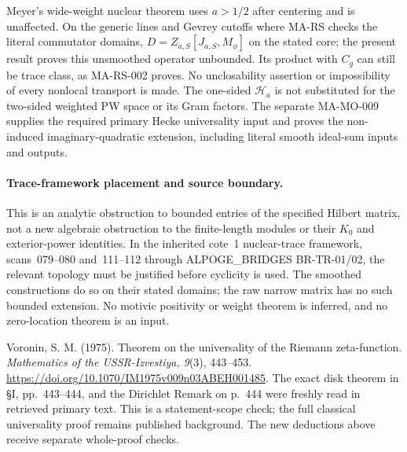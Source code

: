 Meyer's wide-weight nuclear theorem uses \(a>1/2\)
after centering and is unaffected.
On the generic lines and Gevrey cutoffs where MA-RS
checks the literal commutator domains,
\(D=Z_{a,S}[J_{a,S},M_\phi]\) on the stated core;
the present result proves this unsmoothed operator
unbounded. Its product with \(C_g\) can still be
trace class, as MA-RS-002 proves.
No unclosability assertion or impossibility of
every nonlocal transport is made.
The one-sided \(\mathcal H_a\) is not substituted
for the two-sided weighted PW space or its Gram factors.
The separate MA-MO-009 supplies the required primary
Hecke universality input and proves the non-induced
imaginary-quadratic extension, including literal
smooth ideal-sum inputs and outputs.

\paragraph{Trace-framework placement and source boundary.}
This is an analytic obstruction to bounded entries
of the specified Hilbert matrix, not a new algebraic
obstruction to the finite-length modules or their
\(K_0\) and exterior-power identities.
In the inherited cote~1 nuclear-trace framework,
scans~079--080 and~111--112 through
ALPOGE\_BRIDGES BR-TR-01/02, the relevant topology
must be justified before cyclicity is used.
The smoothed constructions do so on their stated
domains; the raw narrow matrix has no such bounded
extension. No motivic positivity or weight theorem
is inferred, and no zero-location theorem is an input.

Voronin, S. M. (1975). Theorem on the universality
of the Riemann zeta-function.
\emph{Mathematics of the USSR-Izvestiya, 9}(3), 443--453.
\url{https://doi.org/10.1070/IM1975v009n03ABEH001485}.
The exact disk theorem in \S I, pp.~443--444, and
the Dirichlet Remark on p.~444 were freshly read
in retrieved primary text. This is a statement-scope
check; the full classical universality proof remains
published background. The new deductions above
receive separate whole-proof checks.
